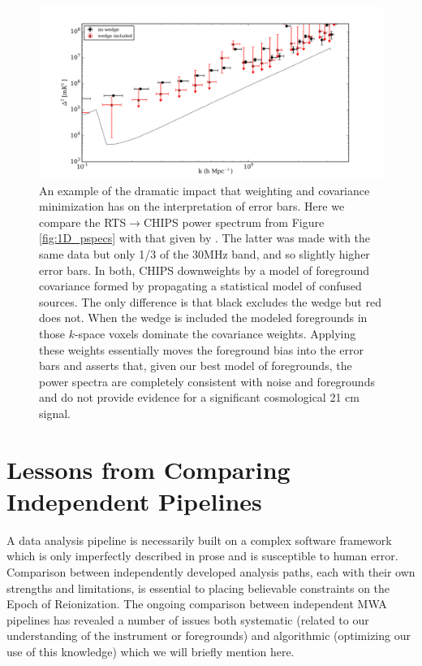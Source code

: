 \documentclass[twolcolumn]{emulateapj}
\def\chipscite{\cite{2016arXiv160102073T}}
\begin{document}
\begin{figure}[htbp]
\begin{center}
\includegraphics[width=\textwidth]{MWAPipeline_compare_1d_radial_chips_pub.png}
\caption{An example of the dramatic impact that weighting and covariance minimization has on the interpretation of error bars.  Here we compare the RTS$\to$CHIPS power spectrum from Figure \ref{fig:1D_pspecs} with that given by \chipscite{}. The latter was made with the same data but only 1/3 of the 30MHz band, and so slightly higher error bars.  In both, CHIPS downweights by a model of foreground covariance formed by propagating a statistical model of confused sources. The only difference is that black excludes the wedge but red does not. When the wedge is included the modeled foregrounds in those $k$-space voxels dominate the covariance weights. Applying these weights essentially moves the foreground bias into the error bars and asserts that, given our best model of foregrounds, the power spectra are completely consistent with noise and foregrounds and do not provide evidence for a significant cosmological 21 cm signal.}
\label{fig:CHIPS_compare}
\end{center}
\end{figure}

\section{Lessons from Comparing Independent Pipelines}
\label{sec:lessons}
          A data analysis pipeline is necessarily built on a complex software framework which is only imperfectly described in prose and is susceptible to human error.  Comparison between independently developed analysis paths, each with their own strengths and limitations, is essential to placing believable constraints on the Epoch of Reionization. The ongoing comparison between independent MWA pipelines has revealed a number of issues both systematic (related to our understanding of the instrument or foregrounds) and algorithmic (optimizing our use of this knowledge) which we will briefly mention here.
      
\end{document}
